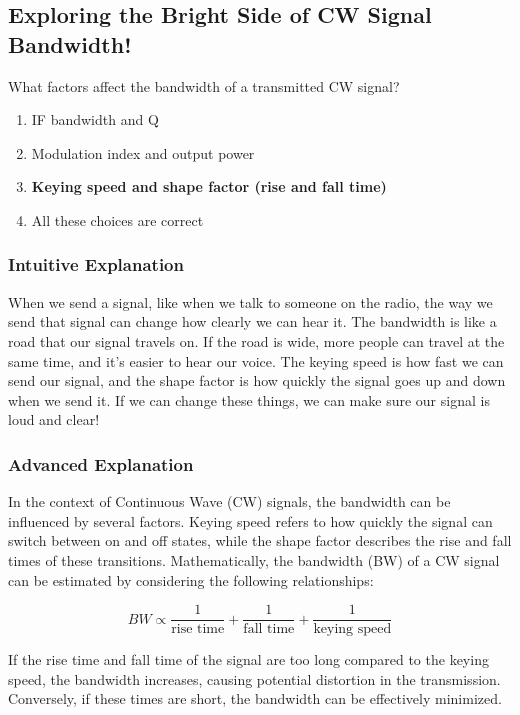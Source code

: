 \subsection{Exploring the Bright Side of CW Signal Bandwidth!}

\begin{tcolorbox}[colback=blue!5!white, colframe=blue!75!black, title=Question E8C12]
What factors affect the bandwidth of a transmitted CW signal?
\begin{enumerate}[label=\Alph*.]
    \item IF bandwidth and Q
    \item Modulation index and output power
    \item \textbf{Keying speed and shape factor (rise and fall time)}
    \item All these choices are correct
\end{enumerate}
\end{tcolorbox}

\subsubsection{Intuitive Explanation}

When we send a signal, like when we talk to someone on the radio, the way we send that signal can change how clearly we can hear it. The bandwidth is like a road that our signal travels on. If the road is wide, more people can travel at the same time, and it's easier to hear our voice. The keying speed is how fast we can send our signal, and the shape factor is how quickly the signal goes up and down when we send it. If we can change these things, we can make sure our signal is loud and clear!

\subsubsection{Advanced Explanation}

In the context of Continuous Wave (CW) signals, the bandwidth can be influenced by several factors. Keying speed refers to how quickly the signal can switch between on and off states, while the shape factor describes the rise and fall times of these transitions. Mathematically, the bandwidth (BW) of a CW signal can be estimated by considering the following relationships:

\[
BW \propto \frac{1}{\text{rise time}} + \frac{1}{\text{fall time}} + \frac{1}{\text{keying speed}}
\]

If the rise time and fall time of the signal are too long compared to the keying speed, the bandwidth increases, causing potential distortion in the transmission. Conversely, if these times are short, the bandwidth can be effectively minimized. 

